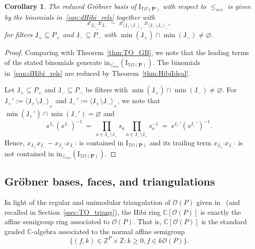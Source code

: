 \documentclass[11pt]{amsart}
\newtheorem{cor}[thm]{Corollary}
\theoremstyle{definition}
\begin{document}
\begin{cor}\label{cor:redGB}
    The reduced Gr\"obner basis of ${\mathrm{I}}_{{{\mathbb{T}}{\mathcal{O}({\mathbf{P}})}}}$ with respect to ${\le_{rev}}$ is
    given by the binomials in~\eqref{eqn:dHibi_rels} together with
    \[
    \underline{x_{{\mathsf{J}}_+} \, x_{{\mathsf{J}}_-}} \ - \ 
        x_{{\langle {{\mathsf{J}}_+ \setminus {\mathsf{J}}_-} \rangle}_+} \,
        x_{{\langle {{\mathsf{J}}_- \setminus {\mathsf{J}}_+} \rangle}_-},
    \]
    for filters ${\mathsf{J}}_+ \subseteq {P}_+$ and  
    ${\mathsf{J}}_- \subseteq {P}_-$ with $\min({\mathsf{J}}_+) \cap \min({\mathsf{J}}_-) \neq
    {\varnothing}$.
\end{cor}
\begin{proof}
    Comparing with Theorem~\ref{thm:TO_GB}, we note that the leading terms of the
    stated binomials generate ${\textrm{in}_{\le_{rev}}}({\mathrm{I}}_{{{\mathbb{T}}{\mathcal{O}({\mathbf{P}})}}})$. The binomials
    in~\eqref{eqn:dHibi_rels} are reduced by Theorem~\ref{thm:HibiIdeal}. 
    
    Let ${\mathsf{J}}_+ \subseteq {P}_+$ and ${\mathsf{J}}_- \subseteq {P}_-$ be filters
    with $\min({\mathsf{J}}_+) \cap \min({\mathsf{J}}_-) \neq {\varnothing}$. For
    ${\mathsf{J}}_+' := {\langle {{\mathsf{J}}_+ \setminus {\mathsf{J}}_-} \rangle}_+$ and ${\mathsf{J}}_-'
    := {\langle {{\mathsf{J}}_+ \setminus {\mathsf{J}}_-} \rangle}_+$, we note that
    $\min({\mathsf{J}}_+') \cap \min({\mathsf{J}}_-')  = {\varnothing}$ and
    \[
        s^{{\mathsf{J}}_+} (s^{{\mathsf{J}}_-})^{-1} \ = \ 
        \prod_{a \in {\mathsf{J}}_+ \setminus {\mathsf{J}}_-} s_a
        \prod_{a \in {\mathsf{J}}_- \setminus {\mathsf{J}}_+} s_a^{-1}
        \ = \ s^{{\mathsf{J}}_+'} (s^{{\mathsf{J}}_-'})^{-1}.
    \]
    Hence, $x_{{\mathsf{J}}_+} x_{{\mathsf{J}}_-} - x_{{\mathsf{J}}_+'} x_{{\mathsf{J}}_-'}$
    is contained in ${\mathrm{I}}_{{{\mathbb{T}}{\mathcal{O}({\mathbf{P}})}}}$ and its trailing term $x_{{\mathsf{J}}_+'}
    x_{{\mathsf{J}}_-'}$ is not contained in ${\textrm{in}_{\le_{rev}}}({\mathrm{I}}_{{{\mathbb{T}}{\mathcal{O}({\mathbf{P}})}}})$.
\end{proof}

\subsection{Gr\"obner bases, faces, and triangulations}\label{ssec:GB_triang}
In light of the regular and unimodular triangulation of ${\mathcal{O}({P})}$ given
in~\cite{TwoPoset} (and recalled in Section~\ref{ssec:TO_triang}), the Hibi
ring ${{\mathbb{C}}[{\mathcal{O}({P})}]}$ is exactly the affine semigroup ring associated to
${\mathcal{O}({P})}$. That is, ${{\mathbb{C}}[{\mathcal{O}({P})}]}$ is the standard graded ${\mathbb{C}}$-algebra associated to the
normal affine semigroup 
\[
    \{ (f,k) \in {\mathbb{Z}}^{P} \times {\mathbb{Z}} : k \ge 0, f \in k {\mathcal{O}({P})}\}.
\]
\end{document}
